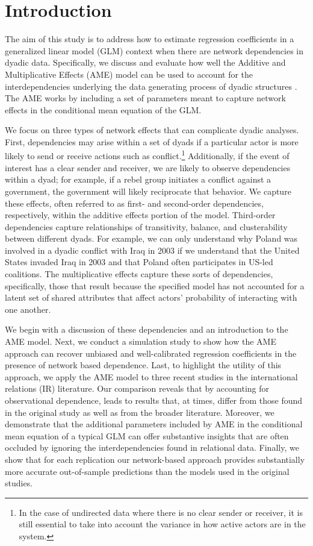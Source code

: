 \section{\textbf{Introduction}}

The aim of this study is to address how to estimate regression coefficients in a generalized linear model (GLM) context when there are network dependencies in dyadic data. Specifically, we discuss and evaluate how well the Additive and Multiplicative Effects (AME) model can be used to account for the interdependencies underlying the data generating process of dyadic structures \citep{hoff:2005,hoff:2008,minhas:etal:2019}. The AME works by including a set of parameters meant to capture network effects in the conditional mean equation of the GLM.

We focus on three types of network effects that can complicate dyadic analyses. First, dependencies may arise within a set of dyads if a particular actor is more likely to send or receive actions such as conflict.\footnote{In the case of undirected data where there is no clear sender or receiver, it is still essential to take into account the variance in how active actors are in the system.} Additionally, if the event of interest has a clear sender and receiver, we are likely to observe dependencies within a dyad; for example, if a rebel group initiates a conflict against a government, the government will likely reciprocate that behavior. We capture these effects, often referred to as first- and second-order dependencies, respectively, within the additive effects portion of the model. Third-order dependencies capture relationships of transitivity, balance, and clusterability between different dyads. For example, we can only understand why Poland was involved in a dyadic conflict with Iraq in 2003 if we understand that the United States invaded Iraq in 2003 and that Poland often participates in US-led coalitions. The multiplicative effects capture these sorts of dependencies, specifically, those that result because the specified model has not accounted for a latent set of shared attributes that affect actors' probability of interacting with one another.

We begin with a discussion of these dependencies and an introduction to the AME model. Next, we conduct a simulation study to show how the AME approach can recover unbiased and well-calibrated regression coefficients in the presence of network based dependence. Last, to highlight the utility of this approach, we apply the AME model to three recent studies in the international relations (IR) literature. Our comparison reveals that by accounting for observational dependence, leads to results that, at times, differ from those found in the original study as well as from the broader literature. Moreover, we demonstrate that the additional parameters included by AME in the conditional mean equation of a typical GLM can offer substantive insights that are often occluded by ignoring the interdependencies found in relational data. Finally, we show that for each replication our network-based approach provides substantially more accurate out-of-sample predictions than the models used in the original studies.

